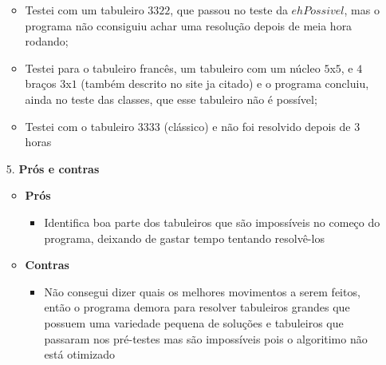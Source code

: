 \documentclass[12pt, a4paper]{article} %
\begin{document}
\begin{enumerate}
\begin{itemize}
\item Testei com um tabuleiro $3322$, que passou no teste da $ehPossivel$, mas o programa não cconsiguiu achar uma resolução depois de meia hora rodando;
\item Testei para o tabuleiro francês, um tabuleiro com um núcleo $5$x$5$, e $4$ braços $3$x$1$ (também descrito no site ja citado) e o programa concluiu, ainda no teste das classes, que esse tabuleiro não é possível;
\item Testei com o tabuleiro $3333$ (clássico) e não foi resolvido depois de 3 horas\\[0.5cm]
\end{itemize}
\large
\item[5.]\textbf{Prós e contras}
\normalsize\\[-0.5cm]
\begin{itemize}
\item \textbf{Prós}\\[-0.5cm]
\begin{itemize}
\item Identifica boa parte dos tabuleiros que são impossíveis no começo do programa, deixando de gastar tempo tentando resolvê-los
\end{itemize}
\item \textbf{Contras}
\begin{itemize}
\item Não consegui dizer quais os melhores movimentos a serem feitos, então o programa demora para resolver tabuleiros grandes que possuem uma variedade pequena de soluções e tabuleiros que passaram nos pré-testes mas são impossíveis pois o algoritimo não está otimizado
\end{itemize}
\end{itemize}
\end{enumerate}
\end{document}
